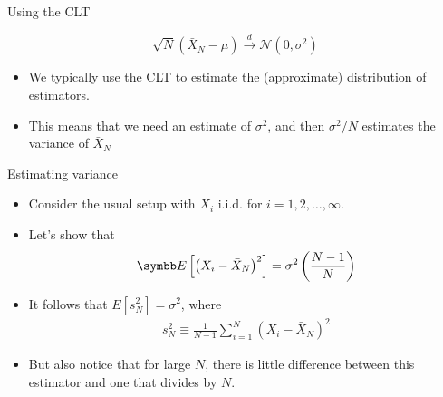 \documentclass[aspectratio=169,11pt]{beamer}
\begin{document}
\begin{frame}{Using the CLT}

	\[
		\sqrt{N} \left( \bar{X}_N  - \mu\right) \overset{d}{\rightarrow} \mathcal{N}\left(0,\sigma^2\right) 
	\]

\begin{itemize}
	\item We typically use the CLT to estimate the (approximate) distribution of estimators.

	\medskip
	\item This means that we need an estimate of $\sigma^2$, and then $\sigma^2/N$ estimates
			the variance of $\bar{X}_N$

\end{itemize}
\end{frame}





\begin{frame}{Estimating variance}
\begin{itemize}
	\item Consider the usual setup with $X_i$ i.i.d. for $i=1,2,\dots,\infty$.

	\medskip
	\item Let's show that 
	\begin{align*}
			\E\left[\left(X_i - \bar{X}_N \right)^2\right] = \sigma^2 \left(\frac{N-1}{N}\right)
	\end{align*}

	\medskip
	\item It follows that $E\left[s_N^2 \right] = \sigma^2$, where
	\begin{align*}
			s_N^2 \equiv \frac{1}{N-1}\sum_{i=1}^{N} \left(X_i - \bar{X}_N \right)^2
	\end{align*}
	\medskip
	\item But also notice that for large $N$, there is little difference between this estimator and one that divides by $N$.

\end{itemize}
\end{frame}
\end{document}
